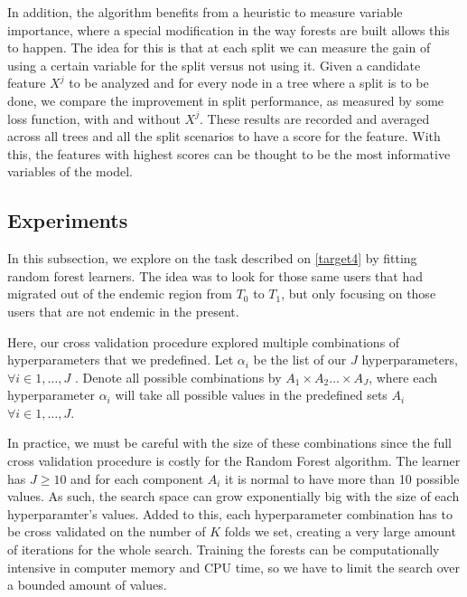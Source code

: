 
In addition, the algorithm benefits from a heuristic to measure variable importance, where a special modification in the way forests are built allows this to happen.
The idea for this is that at each split we can measure the gain of using a certain variable for the split versus not using it.
Given a candidate feature $X^j$ to be analyzed and for every node in a tree where a split is to be done, we compare the improvement in split performance, as measured by some loss function, with and without $X^j$.
These results are recorded and averaged across all trees and all the split scenarios to have a score for the feature.
With this, the features with highest scores can be thought to be the most informative variables of the model.

\subsection{Experiments}\label{subsection:random_forests_experiments}

In this subsection, we explore on the task described on \cref{target4} by fitting random forest learners.
The idea was to look for those same users that had migrated out of the endemic region from  $T_0$ to  $T_1$, but only focusing on those users that are not endemic in the present.

Here, our cross validation procedure explored multiple combinations of hyperparameters that we predefined.
Let $\alpha_i $ be the list of our $J$ hyperparameters, $\forall i \in {1,\ldots,J}$ .
Denote all possible combinations by $A_1 \times A_2 \ldots \times  A_J$, where each hyperparameter $\alpha_i$ will take all possible values in the predefined sets $A_i$ $ \forall i \in {1,\ldots,J}$.

In practice, we must be careful with the size of these combinations since the full cross validation procedure is costly for the Random Forest algorithm.
The learner has $J \geq 10$ and for each component $A_i$ it is normal to have more than 10 possible values.
As such, the search space can grow exponentially big with the size of each hyperparamter's values.
Added to this, each hyperparameter combination has to be cross validated on the number of $K$ folds we set, creating a very large amount of iterations for the whole search.
Training the forests can be computationally intensive in computer memory and CPU time, so we have to limit the search over a bounded amount of values.

